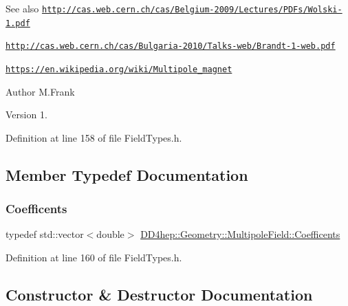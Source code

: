 \begin{DoxySeeAlso}{See also}
\href{http://cas.web.cern.ch/cas/Belgium-2009/Lectures/PDFs/Wolski-1.pdf}{\tt http\+://cas.\+web.\+cern.\+ch/cas/\+Belgium-\/2009/\+Lectures/\+P\+D\+Fs/\+Wolski-\/1.\+pdf} 

\href{http://cas.web.cern.ch/cas/Bulgaria-2010/Talks-web/Brandt-1-web.pdf}{\tt http\+://cas.\+web.\+cern.\+ch/cas/\+Bulgaria-\/2010/\+Talks-\/web/\+Brandt-\/1-\/web.\+pdf} 

\href{https://en.wikipedia.org/wiki/Multipole_magnet}{\tt https\+://en.\+wikipedia.\+org/wiki/\+Multipole\+\_\+magnet}
\end{DoxySeeAlso}
\begin{DoxyAuthor}{Author}
M.\+Frank 
\end{DoxyAuthor}
\begin{DoxyVersion}{Version}
1. 
\end{DoxyVersion}


Definition at line 158 of file Field\+Types.\+h.



\subsection{Member Typedef Documentation}
\hypertarget{class_d_d4hep_1_1_geometry_1_1_multipole_field_a760b1b7561c93dd8438ea523cbc660bc}{}\label{class_d_d4hep_1_1_geometry_1_1_multipole_field_a760b1b7561c93dd8438ea523cbc660bc} 
\subsubsection{\texorpdfstring{Coefficents}{Coefficents}}
{\footnotesize\ttfamily typedef std\+::vector$<$double$>$ \hyperlink{class_d_d4hep_1_1_geometry_1_1_multipole_field_a760b1b7561c93dd8438ea523cbc660bc}{D\+D4hep\+::\+Geometry\+::\+Multipole\+Field\+::\+Coefficents}}



Definition at line 160 of file Field\+Types.\+h.



\subsection{Constructor \& Destructor Documentation}
\hypertarget{class_d_d4hep_1_1_geometry_1_1_multipole_field_a66745189fa088d26122bbf841eb18f90}{}\label{class_d_d4hep_1_1_geometry_1_1_multipole_field_a66745189fa088d26122bbf841eb18f90} 
